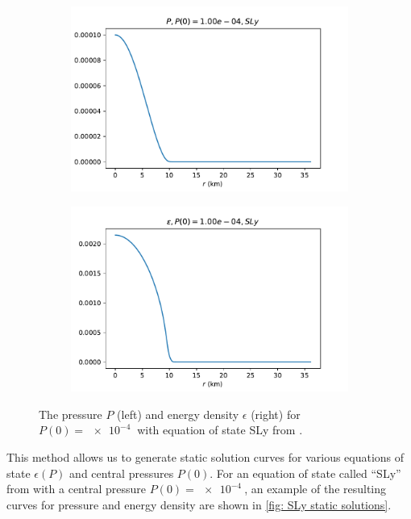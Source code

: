 \begin{figure}[h!]
    \centering
    \begin{subfigure}{.5\textwidth}
        \includegraphics[width=\textwidth]{images/tov/SLy_P,p00.0001.pdf}
    \end{subfigure}%
    \begin{subfigure}{.5\textwidth}
        \includegraphics[width=\textwidth]{images/tov/SLy_rho,p00.0001.pdf}
    \end{subfigure}
    \caption{The pressure $P$ (left) and energy density $\epsilon$ (right) for $P(0) = \SI{e-4}{}$ with equation of state SLy from \autocite{SLy_2004}.}
    \label{fig: SLy static solutions}
\end{figure}

This method allows us to generate static solution curves for various equations of state $\epsilon (P)$ and central pressures $P(0)$. For an equation of state called ``SLy'' from \autocite{SLy_2004} with a central pressure $P(0) = \SI{e-4}{}$, an example of the resulting curves for pressure and energy density are shown in \autoref{fig: SLy static solutions}.

